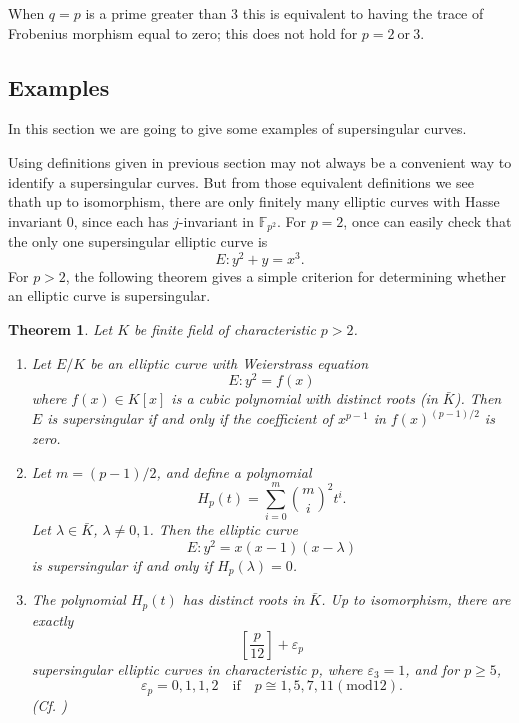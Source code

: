 \documentclass{article}
\theoremstyle{theorem}
\newtheorem{theorem}{Theorem}
\theoremstyle{definition}
\begin{document}
When $q=p$ is a prime greater than 3 this is equivalent to having the trace of Frobenius morphism equal to zero; this does not hold for $p = 2 \ \text{or} \ 3$.

 \subsection{Examples}

In this section we are going to give some examples of supersingular curves.

Using definitions given in previous section may not always be a convenient way to identify a supersingular curves. But from those equivalent definitions we see thath up to isomorphism, there are only finitely many elliptic curves with Hasse invariant 0, since each has $j$-invariant in $\mathbb{F}_{p^2}$. For $p = 2$, once can easily check that the only one supersingular elliptic curve is 
	\[ E: y^2 + y = x^3. \]
For $p > 2$, the following theorem gives a simple criterion for determining whether an elliptic curve is supersingular.

\begin{theorem} \label{thm1}
	Let $K$ be finite field of characteristic $p > 2$.
		\begin{enumerate}[label = (\alph*)]
			\item Let $E/K$ be an elliptic curve with Weierstrass equation 
					\[ E: y^2 = f(x) \]
				where $f(x) \in K[x]$ is a cubic polynomial with distinct roots (in $\bar{K}$). Then $E$ is supersingular if and only if the coefficient of $x^{p - 1}$ in $f(x)^{(p - 1)/2}$ is zero.
			
			\item  Let $m = (p - 1)/2$, and define a polynomial
					\[H_p(t) = \sum_{i = 0}^{m} \binom{m}{i}^2t^i. \]
				Let $\lambda \in \bar{K}$, $\lambda \neq 0, 1$. Then the elliptic curve
					\[E: y^2 = x(x - 1)(x - \lambda)  \]
				is supersingular if and only if $H_p(\lambda) = 0$.
			
			\item The polynomial $H_p(t)$ has distinct roots in $\bar{K}$. Up to isomorphism, there are exactly
					\[ [\frac{p}{12}] + \varepsilon_p \]
				supersingular elliptic curves in characteristic $p$, where $\varepsilon_3 = 1$, and for $p \geq 5$,
					\[\varepsilon_p = 0, 1, 1, 2 \quad \textrm{if} \quad p \cong 1, 5, 7, 11 (\mathrm{mod}12). \]
			(Cf. \cite[V, \S4, Theorem 4.1]{Silverman})
		\end{enumerate}
\end{theorem}
\end{document}
